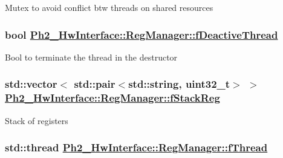 Mutex to avoid conflict btw threads on shared resources \hypertarget{class_ph2___hw_interface_1_1_reg_manager_e337041a55b10db74bbd8e171424807a}{
\subsubsection[fDeactiveThread]{\setlength{\rightskip}{0pt plus 5cm}bool \hyperlink{class_ph2___hw_interface_1_1_reg_manager_e337041a55b10db74bbd8e171424807a}{Ph2\_\-Hw\-Interface::Reg\-Manager::f\-Deactive\-Thread}}}
\label{class_ph2___hw_interface_1_1_reg_manager_e337041a55b10db74bbd8e171424807a}


Bool to terminate the thread in the destructor \hypertarget{class_ph2___hw_interface_1_1_reg_manager_2302b9eaa5f8edfbaa5cc8d844265833}{
\subsubsection[fStackReg]{\setlength{\rightskip}{0pt plus 5cm}std::vector$<$ std::pair$<$std::string, uint32\_\-t$>$ $>$ \hyperlink{class_ph2___hw_interface_1_1_reg_manager_2302b9eaa5f8edfbaa5cc8d844265833}{Ph2\_\-Hw\-Interface::Reg\-Manager::f\-Stack\-Reg}}}
\label{class_ph2___hw_interface_1_1_reg_manager_2302b9eaa5f8edfbaa5cc8d844265833}


Stack of registers \hypertarget{class_ph2___hw_interface_1_1_reg_manager_3aa2f1c4769f122a2e902f2d70865b30}{
\subsubsection[fThread]{\setlength{\rightskip}{0pt plus 5cm}std::thread \hyperlink{class_ph2___hw_interface_1_1_reg_manager_3aa2f1c4769f122a2e902f2d70865b30}{Ph2\_\-Hw\-Interface::Reg\-Manager::f\-Thread}}}
\label{class_ph2___hw_interface_1_1_reg_manager_3aa2f1c4769f122a2e902f2d70865b30}


